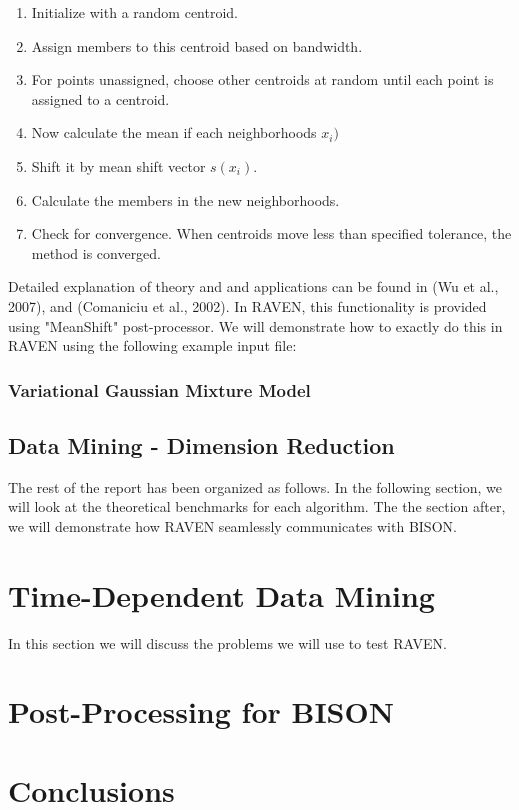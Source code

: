 \documentclass[11pt]{article}
\begin{document}
\begin{enumerate}

\item Initialize with a random centroid. 

\item Assign members to this centroid based on bandwidth. 

\item For points unassigned, choose other centroids at random until each point is assigned to a centroid. 

\item Now calculate the mean if each neighborhoods $x_i)$ 

\item Shift it by mean shift vector $s(x_i)$. 

\item Calculate the members in the new neighborhoods. 

\item Check for convergence. When centroids move less than specified tolerance, the method is converged. 
 
\end{enumerate}

Detailed explanation of theory and and applications can be found in (Wu et al., 2007), and (Comaniciu et al., 2002). In RAVEN, this functionality is provided using "MeanShift" post-processor. We will demonstrate how to exactly do this in RAVEN using the following example input file: 


 

\subsubsection{Variational Gaussian Mixture Model}

\subsection{Data Mining - Dimension Reduction}

The rest of the report has been organized as follows. In the following section, we will look at the theoretical benchmarks for each algorithm. The the section after, we will demonstrate how RAVEN seamlessly communicates with BISON.  

\section{Time-Dependent Data Mining}

In this section we will discuss the problems we will use to test RAVEN. 

\section{Post-Processing for BISON}



\section{Conclusions}
\end{document}
